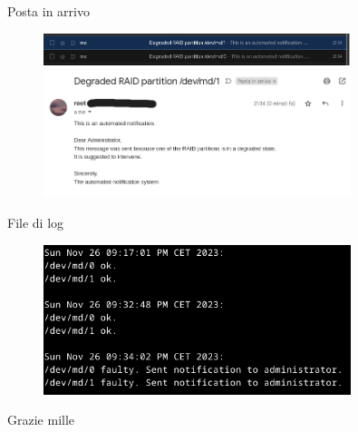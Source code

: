 \documentclass{beamer}
\begin{document}
\begin{frame}[fragile]{Posta in arrivo}
    \begin{figure}[H]
        \includegraphics[width=0.8\textwidth, keepaspectratio]{../img/inbox.png}
        \centering
    
        \includegraphics[width=0.8\textwidth, keepaspectratio]{../img/mail.png}
        \centering
    \end{figure}
\end{frame}

\begin{frame}[fragile]{File di log}
    \begin{figure}[H]
        \includegraphics[width=0.8\textwidth, keepaspectratio]{../img/log.png}
        \centering
    \end{figure}
\end{frame}

\begin{frame}[standout]
    Grazie mille
    \\
    \Huge\smiley{}
\end{frame}
\end{document}
